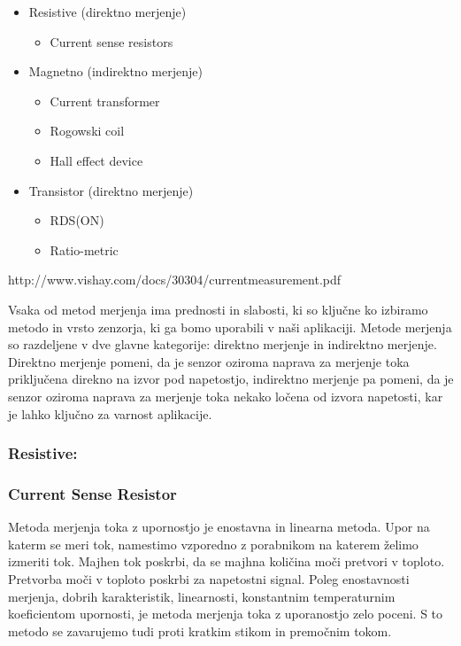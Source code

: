 \documentclass[12pt,a4paper,titlepage,openany]{report}
\begin{document}
\begin{itemize}
\item Resistive (direktno merjenje)

\begin{itemize}
\item Current sense resistors
\end{itemize}

 \item Magnetno (indirektno merjenje)

\begin{itemize}
\item Current transformer
\item Rogowski coil
\item Hall effect device
\end{itemize}

\item Transistor (direktno merjenje)

\begin{itemize}
\item RDS(ON)
\item Ratio-metric
\end{itemize}

\end{itemize}

http://www.vishay.com/docs/30304/currentmeasurement.pdf

Vsaka od metod merjenja ima prednosti in slabosti, ki so ključne ko izbiramo metodo in vrsto zenzorja, ki ga bomo uporabili
v naši aplikaciji. Metode merjenja so razdeljene v dve glavne kategorije: direktno merjenje in indirektno merjenje.
Direktno merjenje pomeni, da je senzor oziroma naprava za merjenje toka priključena direkno na izvor pod napetostjo, 
indirektno merjenje pa pomeni, da je senzor oziroma naprava za merjenje toka nekako ločena od izvora napetosti, 
kar je lahko ključno za varnost aplikacije.

\subsubsection{Resistive:}
\subsubsection{Current Sense Resistor}
Metoda merjenja toka z upornostjo je enostavna in linearna metoda. Upor na katerm se meri tok, namestimo vzporedno z porabnikom na katerem želimo izmeriti tok.
Majhen tok poskrbi, da se majhna količina moči pretvori v toploto. Pretvorba moči v toploto poskrbi za napetostni signal. Poleg enostavnosti merjenja, dobrih karakteristik, linearnosti, 
konstantnim temperaturnim koeficientom upornosti, je metoda merjenja toka z uporanostjo zelo poceni. S to metodo se zavarujemo tudi proti kratkim stikom in premočnim tokom.
\end{document}
